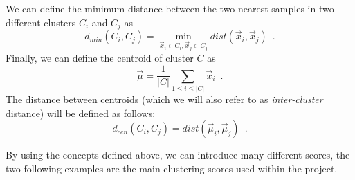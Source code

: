 We can define the minimum distance between the two nearest samples in two different clusters $C_i$
and $C_j$ as
\begin{equation}
	\label{eq:inter-cluster-distance}
	d_{min}(C_i, C_j) = \min_{\vec{x}_i \in C_i, \vec{x}_j \in C_j} dist(\vec{x}_i, \vec{x}_j)
	\enspace.
\end{equation}
Finally, we can define the centroid of cluster $C$ as
\begin{equation}
	\label{eq:centroid}
	\vec{\mu} = \frac{1}{|C|} \sum_{1 \leq i \leq |C|} \vec{x}_i
	\enspace.
\end{equation}
The distance between centroids (which we will also refer to as \emph{inter-cluster} distance) will be defined as follows:
\begin{equation}
	\label{eq:cluster-centroid-distance}
	d_{cen}(C_i, C_j) = dist(\vec{\mu}_i, \vec{\mu}_j)
	\enspace.
\end{equation}

By using the concepts defined above, we can introduce many different scores, the two following
examples are the main clustering scores used within the project.

